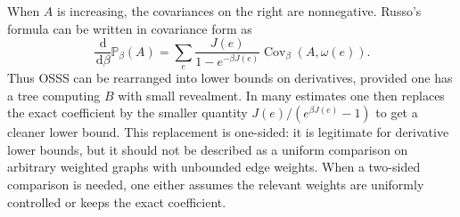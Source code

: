 \documentclass[11pt,reqno]{book}
\numberwithin{equation}{chapter}
\theoremstyle{plain}
\theoremstyle{definition}
\theoremstyle{remark}
\renewcommand{\P}{\mathbb P}
\newcommand{\1}{\mathbf 1}
\newcommand{\dd}{\,\mathrm d}
\begin{document}
When $A$ is increasing, the covariances on the right are nonnegative.
Russo's formula can be written in covariance form as
\[
  \frac{\dd}{\dd\beta}\P_\beta(A)
  =
  \sum_e
  \frac{J(e)}{1-e^{-\beta J(e)}}
  \operatorname{Cov}_\beta(A,\omega(e)).
\]
Thus OSSS can be rearranged into lower bounds on derivatives, provided one has a tree computing $B$ with small revealment. In many estimates one then replaces the exact coefficient by the smaller quantity $J(e)/(e^{\beta J(e)}-1)$ to get a cleaner lower bound. This replacement is one-sided: it is legitimate for derivative lower bounds, but it should not be described as a uniform comparison on arbitrary weighted graphs with unbounded edge weights. When a two-sided comparison is needed, one either assumes the relevant weights are uniformly controlled or keeps the exact coefficient.
\end{document}
